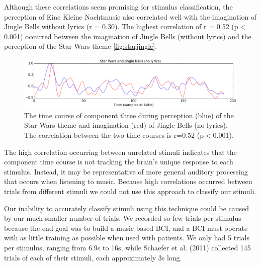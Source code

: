 Although these correlations seem promising for stimulus classification, the perception of Eine Kleine Nachtmusic also correlated well with the imagination of Jingle Bells without lyrics (r = 0.30). 
The highest correlation of r = 0.52 (p$<$0.001) occurred between the imagination of Jingle Bells (without lyrics) and the perception of the Star Wars theme \autoref{fig:starjingle}.
\begin{figure}[htbp]
  \centerline{\includegraphics[scale=0.4]{Figures/TimeCourse-StarJingle}}
  \caption{The time course of component three during perception (blue) of the Star Wars theme and imagination (red) of Jingle Bells (no lyrics). The correlation between the two time courses is r=0.52 (p$<$0.001).}
  \label{fig:starjingle}
\end{figure}
The high correlation occurring between unrelated stimuli indicates that the component time course is not tracking the brain's unique response to each stimulus. 
Instead, it may be representative of more general auditory processing that occurs when listening to music. 
Because high correlations occurred between trials from different stimuli we could not use this approach to classify our stimuli.

Our inability to accurately classify stimuli using this technique could be caused by our much smaller number of trials.
We recorded so few trials per stimulus because the end-goal was to build a music-based BCI, and a BCI must operate with as little training as possible when used with patients. 
We only had 5 trials per stimulus, ranging from 6.9s to 16s, while Schaefer et al. (2011) collected 145 trials of each of their stimuli, each approximately 3s long.